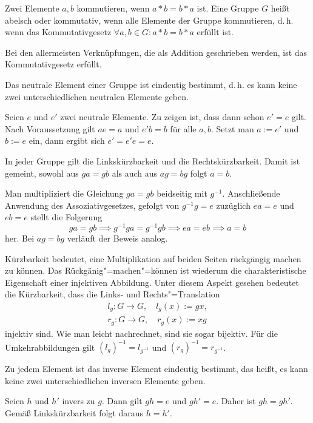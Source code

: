 \begin{Definition}\newlinefirst
Zwei Elemente $a,b$ kommutieren, wenn $a*b=b*a$ ist.
Eine Gruppe $G$ heißt abelsch oder kommutativ, wenn alle
Elemente der Gruppe kommutieren, d.\,h. wenn
das Kommutativgesetz $\forall a,b\in G\colon a*b=b*a$ erfüllt ist.
\end{Definition}
Bei den allermeisten Verknüpfungen, die als Addition 
geschrieben werden, ist das Kommutativgesetz erfüllt.

\begin{Satz} Das neutrale Element einer Gruppe ist eindeutig bestimmt,
d.\,h. es kann keine zwei unterschiedlichen neutralen Elemente geben.
\end{Satz}
 Seien $e$ und $e'$ zwei neutrale Elemente.
Zu zeigen ist, dass dann schon $e'=e$ gilt. Nach Voraussetzung
gilt $ae=a$ und $e'b=b$ für alle $a,b$. Setzt man $a:=e'$ und
$b:=e$ ein, dann ergibt sich $e' = e'e = e.$\;\qedsymbol

\begin{Satz}
In jeder Gruppe gilt die Linkskürzbarkeit und die Rechtskürzbarkeit.
Damit ist gemeint, sowohl aus $ga=gb$ als auch aus $ag=bg$ folgt
$a=b$.
\end{Satz}
 Man multipliziert die Gleichung $ga=gb$ beidseitig
mit $g^{-1}$. Anschließende Anwendung des Assoziativgesetzes, gefolgt
von $g^{-1}g=e$ zuzüglich $ea=e$ und $eb=e$ stellt die Folgerung
\[ga=gb \implies g^{-1}ga=g^{-1}gb \implies ea=eb \implies a=b\]
her. Bei $ag=bg$ verläuft der Beweis analog.\,\qedsymbol

Kürzbarkeit bedeutet, eine Multiplikation auf beiden Seiten
rückgängig machen zu können. Das Rückgänig"=machen"=können
ist wiederum die charakteristische Eigenschaft einer injektiven
Abbildung. Unter diesem Aspekt gesehen bedeutet die Kürzbarkeit,
dass die Links- und Rechts"=Translation
\begin{gather*}
\label{eq:ltrans} l_g\colon G\to G,\quad l_g(x):=gx,\\
\label{eq:rtrans} r_g\colon G\to G,\quad r_g(x):=xg
\end{gather*}
injektiv sind. Wie man leicht nachrechnet, sind sie sogar bijektiv.
Für die Umkehrabbildungen gilt $(l_g)^{-1}=l_{g^{-1}}$ und
$(r_g)^{-1}=r_{g^{-1}}$.

\begin{Satz} Zu jedem Element ist das inverse Element eindeutig
bestimmt, das heißt, es kann keine zwei unterschiedlichen inversen
Elemente geben.
\end{Satz}
 Seien $h$ und $h'$ invers zu $g$. Dann gilt
$gh=e$ und $gh'=e$. Daher ist $gh=gh'$. Gemäß Linkskürzbarkeit
folgt daraus $h=h'$.\;\qedsymbol

